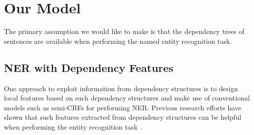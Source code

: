 \section{Our Model}

The primary assumption we would like to make  is that the dependency trees of sentences are available when performing the  named entity recognition task.


\subsection{NER with Dependency Features}

One  approach to exploit information from dependency structures is to design local features based on such dependency structures and make use of conventional models such as semi-CRFs for performing NER.
Previous research efforts have shown that such features extracted from dependency structures can be helpful when performing the entity recognition task~\cite{sasano2008japanese,ling2012fine,cucchiarelli2001unsupervised}.

